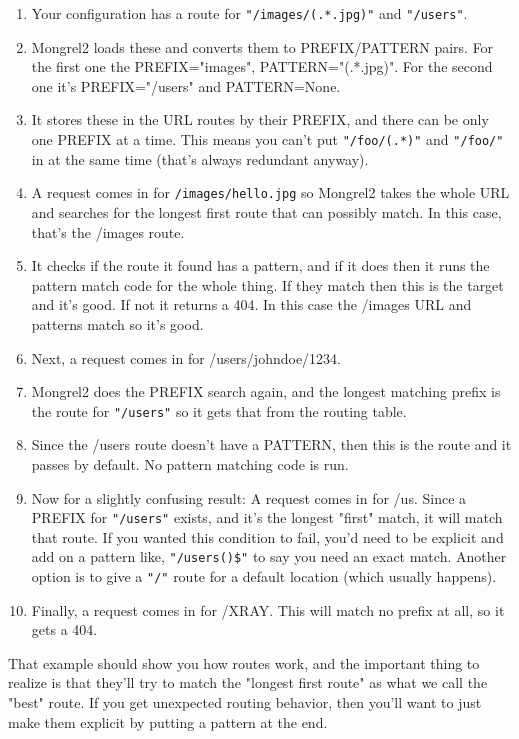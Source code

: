 \begin{enumerate}
\item Your configuration has a route for \verb|"/images/(.*.jpg)"| and \verb|"/users"|.
\item Mongrel2 loads these and converts them to PREFIX/PATTERN pairs.  For the first one
    the PREFIX="images", PATTERN="(.*.jpg)".  For the second one it's PREFIX="/users" and
    PATTERN=None.
\item It stores these in the URL routes by their PREFIX, and there can be only one
    PREFIX at a time.  This means you can't put \verb|"/foo/(.*)"| and \verb|"/foo/"|
    in at the same time (that's always redundant anyway).
\item A request comes in for \verb|/images/hello.jpg| so Mongrel2 takes the whole URL
    and searches for the longest first route that can possibly match.  In this case, that's
    the /images route.
\item It checks if the route it found has a pattern, and if it does then it runs the
    pattern match code for the whole thing.  If they match then this is the target 
    and it's good.  If not it returns a 404.  In this case the /images URL and patterns
    match so it's good.
\item Next, a request comes in for /users/johndoe/1234.
\item Mongrel2 does the PREFIX search again, and the longest matching prefix is the
    route for \verb|"/users"| so it gets that from the routing table.
\item Since the /users route doesn't have a PATTERN, then this is the route and it passes
    by default. No pattern matching code is run.
\item Now for a slightly confusing result:  A request comes in for /us.  Since a PREFIX
    for \verb|"/users"| exists, and it's the longest "first" match, it will match that
    route.  If you wanted this condition to fail, you'd need to be explicit and add on a
    pattern like, \verb|"/users()$"| to say you need an exact match. Another option is
    to give a \verb|"/"| route for a default location (which usually happens).
\item Finally, a request comes in for /XRAY.  This will match no prefix at all, so it
    gets a 404.
\end{enumerate}

That example should show you how routes work, and the important thing to realize
is that they'll try to match the "longest first route" as what we call the "best"
route.  If you get unexpected routing behavior, then you'll want to just make them
explicit by putting a pattern at the end.

